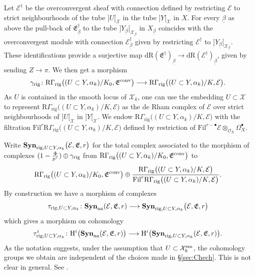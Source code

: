 \documentclass[asterisque,english]{smfart}
\begin{document}
Let $\mathcal{E}^\dagger$ be the overconvergent sheaf with connection defined by restricting $\mathcal {E}$ to strict neighbourhoods of the tube $]U[_\mathcal{X}$ in the tube $]Y[_\mathcal{X}$ in $X$. For every $\underline{\beta}$ as above the pull-back of  $\mathfrak{E}_{\underline{\beta}}^\dagger$ to  the tube $]Y_{\underline{\beta}}[_{\mathcal{X}_{\underline{\beta}}}$ in $X_{\underline{\beta}}$ coincides with the overconvergent module with connection $\mathcal{E}^\dagger_{\underline{\beta}}$ given by restricting $\mathcal{E}^\dagger$ to  $]Y_{\underline{\beta}}[_{\mathcal{X}_{\underline{\beta}}}$. These identifications provide a surjective map $\mathrm{dR}(\mathfrak{E}^\dagger)_{\underline{\beta}}\to \mathrm{dR}(\mathcal{E}^\dagger)_{\underline{\beta}}$, given by sending $Z\to \pi$.  We then get a morphism $$\gamma_{\rm rig}\colon \mathrm{R}\Gamma_{\mathrm{rig}}\bigl((U\subset Y,\alpha_k)/K_0,\mathfrak{E}^{\rm conv}\bigr) \longrightarrow \mathrm{R}\Gamma_{\mathrm{rig}}\bigl((U\subset Y,\alpha_k)/K,\mathcal{E}\bigr) .$$As $U$ is contained in the smooth locus of $\mathcal{X}_k$, one can use the embedding $U\subset \mathcal{X}$ to represent $\mathrm{R}\Gamma_{\mathrm{rig}}\bigl((U\subset Y,\alpha_k)/K,\mathcal{E}\bigr)$ as the de Rham complex of $\mathcal{E}$ over strict  neighbourhoods of $]U[_{\mathcal{X}}$ in $]Y[_\mathcal{X}$. We endow $\mathrm{R}\Gamma_{\mathrm{rig}}\bigl((U\subset Y,\alpha_k)/K,\mathcal{E}\bigr)$  with the filtration  $\mathrm{Fil}^r\mathrm{R}\Gamma_{\mathrm{rig}}\bigl((U\subset Y,\alpha_k)/K,\mathcal{E}\bigr)$ defined by restriction of $\mathrm{Fil}^{r-\bullet} \mathcal{E} \otimes_{\mathcal{O}_X}  \Omega_X^\bullet$. 


Write $\mathbf{Syn}_{{\rm rig},U\subset Y, \alpha_k}\bigl(\mathcal{E},\mathfrak{E},r\bigr)$ for the total complex associated to the morphism of complexes $ (1-\frac{\Phi}{p^r})\oplus \gamma_{\rm rig} $ from $\mathrm{R}\Gamma_{\mathrm{rig}}\bigl((U\subset Y,\alpha_k)/K_0,\mathfrak{E}^{\rm conv}\bigr) $ to $$\mathrm{R}\Gamma_{\mathrm{rig}}\bigl((U\subset Y,\alpha_k)/K_0,\mathfrak{E}^{\rm conv}\bigr) \oplus \frac{ \mathrm{R}\Gamma_{\mathrm{rig}}\bigl((U\subset Y,\alpha_k)/K,\mathcal{E}\bigr)}{\mathrm{Fil}^r  \mathrm{R}\Gamma_{\mathrm{rig}}\bigl((U\subset Y,\alpha_k)/K,\mathcal{E}\bigr)}.$$By construction we have a morphism of complexes $$\tau_{{\rm rig},U\subset Y, \alpha_k}\colon  \mathbf{Syn}_{\rm an}(\mathcal{E},\mathfrak{E},r) \longrightarrow  \mathbf{Syn}_{{\rm rig},U\subset Y, \alpha_k}\bigl(\mathcal{E},\mathfrak{E},r\bigr)$$which  gives a morphism on cohomology $$\tau_{{\rm rig},U\subset Y, \alpha_k}^i\colon \mathrm{H}^i\bigl(\mathbf{Syn}_{\rm an}(\mathcal{E},\mathfrak{E},r)\bigr) \longrightarrow \mathrm{H}^i\bigl(\mathbf{Syn}_{{\rm rig},U\subset Y, \alpha_k}(\mathcal{E},\mathfrak{E},r)\bigr). $$
As the notation suggests, under the assumption that  $U\subset \mathcal{X}_k^{\rm sm}$, the  cohomology groups we obtain are independent of the choices made in \S \ref{sec:Chech}. This is not clear in general. See \cite[Conj. 2.2.20]{Shiho}.
\end{document}

